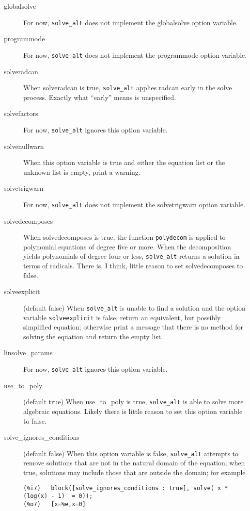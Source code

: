 \documentclass[]{article}%
\newcommand{\altsolve}{\texttt{solve\_alt}}
\newcommand{\solveexplicit}{\texttt{solveexplicit}}
\begin{document}
\begin{description}

\item [globalsolve] For now, \altsolve\/ does not implement the globalsolve option variable.

\item [programmode] For now, \altsolve\/ does not implement the programmode option variable.

\item [solveradcan] When solveradcan is true, \altsolve\/ applies radcan early in the solve process. Exactly what ``early'' means is unspecified.

\item [solvefactors] For now, \altsolve\/ ignores this option variable.

\item [solvenullwarn] When this option variable is true and either the equation list or the unknown list is
empty, print a warning.

\item [solvetrigwarn] For now, \altsolve\/ does not implement the solvetrigwarn option variable.

\item [solvedecomposes] When solvedecomposes is true, the function \texttt{polydecom} is applied to
polynomial equations of degree five or more. When the decomposition yields polynomials of degree four
or less, \altsolve\/ returns a solution in terms of radicals. There is, I think, little reason to
set solvedecomposes to false.

\item [solveexplicit] (default false) When \altsolve\/  is unable to find a solution and the option variable \solveexplicit\/ is false, return an equivalent, but possibly simplified equation;  otherwise print a message that there is no method for solving the equation and return the empty list.

\item [linsolve\_params] For now, \altsolve \/ ignores this option variable.

\item [use\_to\_poly] (default true)  When use\_to\_poly is true, \altsolve\/ is able to solve more algebraic
equations.  Likely there is little reason to set this option variable to false.

\item[solve\_ignores\_conditions] (default false) When this option variable is false, \altsolve\/ attempts to
remove solutions that are not in the natural domain of the equation; when true, solutions may include those that are outside the domain; for example
\begin{verbatim}
(%i7)	block([solve_ignores_conditions : true], solve( x * (log(x) - 1)  = 0));
(%o7)	[x=%e,x=0]


\end{verbatim}
\end{description}
\end{document}

